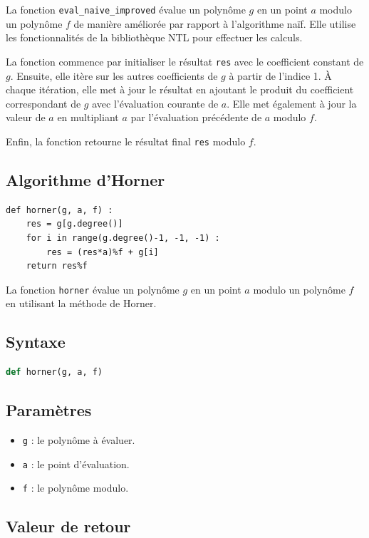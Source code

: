 \documentclass[a4paper]{article}
\begin{document}
La fonction \texttt{eval\_naive\_improved} évalue un polynôme $g$ en un point $a$ modulo un polynôme $f$ de manière améliorée par rapport à l'algorithme naïf. Elle utilise les fonctionnalités de la bibliothèque NTL pour effectuer les calculs.

La fonction commence par initialiser le résultat \texttt{res} avec le coefficient constant de $g$. Ensuite, elle itère sur les autres coefficients de $g$ à partir de l'indice 1. À chaque itération, elle met à jour le résultat en ajoutant le produit du coefficient correspondant de $g$ avec l'évaluation courante de $a$. Elle met également à jour la valeur de $a$ en multipliant $a$ par l'évaluation précédente de $a$ modulo $f$.

Enfin, la fonction retourne le résultat final \texttt{res} modulo $f$.


\subsection{Algorithme d'Horner}

\begin{lstlisting}[frame=leftline, title={Horner}]
def horner(g, a, f) :
    res = g[g.degree()]
    for i in range(g.degree()-1, -1, -1) :
        res = (res*a)%f + g[i]
    return res%f
\end{lstlisting}
La fonction \texttt{horner} évalue un polynôme $g$ en un point $a$ modulo un polynôme $f$ en utilisant la méthode de Horner.

\subsection*{Syntaxe}

\begin{lstlisting}[language=Python]
def horner(g, a, f)
\end{lstlisting}

\subsection*{Paramètres}

\begin{itemize}
  \item \texttt{g} : le polynôme à évaluer.
  \item \texttt{a} : le point d'évaluation.
  \item \texttt{f} : le polynôme modulo.
\end{itemize}

\subsection*{Valeur de retour}
\end{document}
